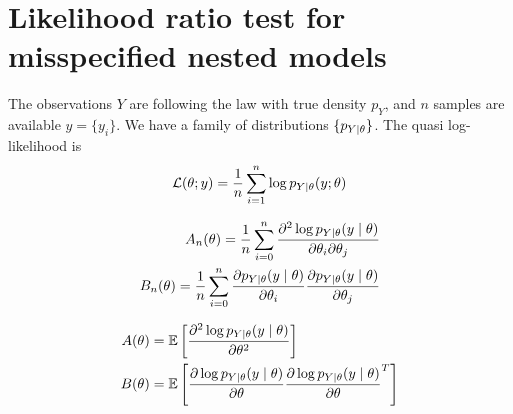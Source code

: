 \documentclass[../../Main_ManuscritThese.tex]{subfiles}
\begin{document}
%	
\appendix





\TitleBtwLines


\pagestyle{appendixStyle}
  \minitoc
\section{Likelihood ratio test for misspecified nested models}
\cite{white_maximum_1982}
The observations $Y$ are following the law with true density $p_Y$, and $n$ samples are available $y=\{y_i\}$.
We have a family of distributions $\{p_{Y\mid \theta}\}$.
  The quasi log-likelihood is
  \begin{equation}
    \mathcal{L}(\theta; y) = \frac{1}{n}\sum_{i=1}^{n} \log p_{Y \mid \theta}(y;\theta)
  \end{equation}

  \begin{align}
    A_n(\theta) = \frac{1}{n} \sum_{i=0}^n \frac{\partial^2 \log p_{Y \mid \theta}(y\mid\theta)}{\partial \theta_i \partial \theta_j} \\
    B_n(\theta) = \frac{1}{n} \sum_{i=0}^n \frac{\partial p_{Y\mid \theta}(y \mid \theta)}{\partial \theta_i} \frac{\partial p_{Y\mid \theta}(y \mid \theta)}{\partial \theta_j}
  \end{align}

  \begin{align}
    A(\theta) &= \mathbb{E}\left[\frac{\partial^2 \log p_{Y\mid \theta}(y \mid \theta)}{\partial \theta^2}\right]\\
    B(\theta) &= \mathbb{E}\left[\frac{\partial \log p_{Y\mid \theta}(y \mid \theta)}{\partial \theta}\frac{\partial \log p_{Y\mid \theta}(y \mid \theta)}{\partial \theta}^T\right]
  \end{align}
\end{document}
